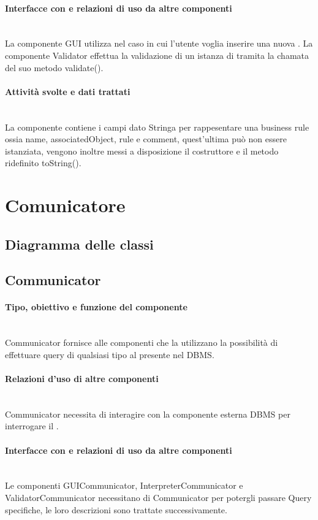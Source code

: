 \documentclass[11pt,titlepage,a4paper]{report}
\begin{document}
\paragraph{Interfacce con e relazioni di uso da altre componenti}\\
La componente GUI utilizza \BR nel caso in cui l'utente voglia inserire una nuova \br.
La componente Validator effettua la validazione di un istanza di \BR tramita la chamata del suo metodo validate().
\paragraph{Attivit\`a svolte e dati trattati}\\
La componente contiene i campi dato Stringa per rappesentare una business rule ossia name, associatedObject, rule e comment, quest'ultima può non essere istanziata, vengono inoltre messi a disposizione il costruttore e il metodo ridefinito toString().

\section{Comunicatore}
\subsection{Diagramma delle classi}
\subsection{Communicator}
\paragraph{Tipo, obiettivo e funzione del componente}\\
Communicator fornisce alle componenti che la utilizzano la possibilit\`a di effettuare query di qualsiasi tipo al \re presente nel DBMS.
\paragraph{Relazioni d'uso di altre componenti}\\
Communicator necessita di interagire con la componente esterna DBMS per interrogare il \re.
\paragraph{Interfacce con e relazioni di uso da altre componenti}\\
Le componenti GUICommunicator, InterpreterCommunicator e ValidatorCommunicator necessitano di Communicator per potergli passare Query specifiche, le loro descrizioni sono trattate successivamente.
\end{document}
